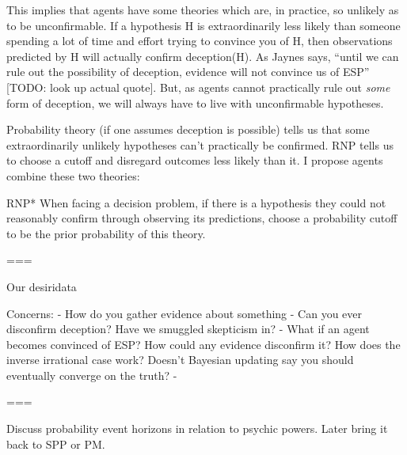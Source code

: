 This implies that agents have some theories which are, in practice, so unlikely as to be unconfirmable. If a hypothesis H is extraordinarily less likely than someone spending a lot of time and effort trying to convince you of H, then observations predicted by H will actually confirm deception(H). As Jaynes says, ``until we can rule out the possibility of deception, evidence will not convince us of ESP'' [TODO: look up actual quote]. But, as agents cannot practically rule out \textit{some} form of deception, we will always have to live with unconfirmable hypotheses.

Probability theory (if one assumes deception is possible) tells us that some extraordinarily unlikely hypotheses can't practically be confirmed. RNP tells us to choose a cutoff and disregard outcomes less likely than it. I propose agents combine these two theories:

RNP* When facing a decision problem, if there is a hypothesis they could not reasonably confirm through observing its predictions, choose a probability cutoff \epsilon to be the prior probability of this theory.

=== 

Our desiridata

Concerns:
 - How do you gather evidence about something
 - Can you ever disconfirm deception? Have we smuggled skepticism in?
 - What if an agent becomes convinced of ESP? How could any evidence disconfirm it? How does the inverse irrational case work? Doesn't Bayesian updating say you should eventually converge on the truth?
 - 

===

Discuss probability event horizons in relation to psychic powers. Later bring it back to SPP or PM.

